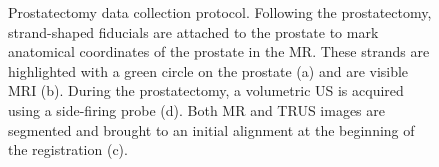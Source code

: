 \documentclass[journal]{IEEEtran}
\begin{document}
\begin{figure}[t]
\caption{Prostatectomy data collection protocol. Following the prostatectomy, strand-shaped fiducials are attached to the prostate to mark anatomical coordinates of the prostate in the MR. These strands are highlighted with a green circle on the prostate (a) and are visible MRI (b). During the prostatectomy, a volumetric US is acquired using a side-firing probe (d). Both MR and TRUS images are segmented and brought to an initial alignment at the beginning of the registration (c). \label{fig:prostatectomyData}}
\end{figure}
\end{document}
